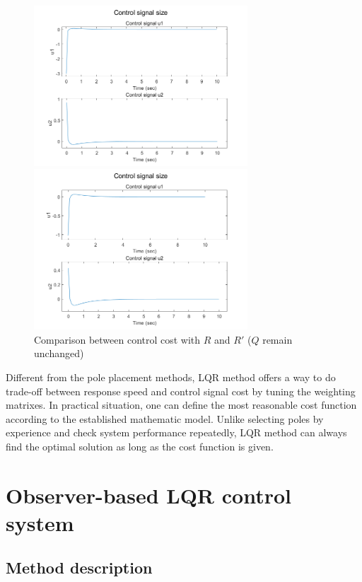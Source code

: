 \documentclass[hyperref]{article}
\theoremstyle{nonumberplain}
\begin{document}
\begin{figure}[H]
		\begin{minipage}[t]{0.48\textwidth}
			\centering
			\includegraphics[width=8cm]{fig17.png}
		\end{minipage}
		\begin{minipage}[t]{0.48\textwidth}
			\centering
			\includegraphics[width=8cm]{fig19.png}
		\end{minipage}
		\caption{Comparison between control cost with $R$ and ${R}'$ ($Q$ remain unchanged)}
		
		\label{fig14}
	\end{figure}

	Different from the pole placement methods, LQR method offers a way to do trade-off between response speed and control signal cost by tuning the weighting matrixes. In practical situation, one can define the most reasonable cost function according to the established mathematic model. Unlike selecting poles by experience and check system performance repeatedly, LQR method can always find the optimal solution as long as the cost function is given.
	
	\section{Observer-based LQR control system}
	
	\subsection{Method description}
	
\end{document}
